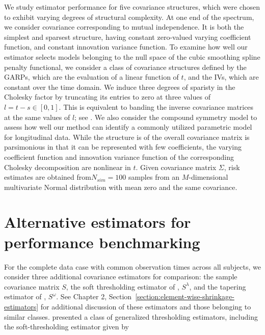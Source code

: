 \documentclass[12pt]{article}
\theoremstyle{definition}
\begin{document}
\bigskip

We study estimator performance for five covariance structures, which were chosen to exhibit varying degrees of structural complexity. At one end of the spectrum, we consider covariance corresponding to mutual independence. It is both the simplest and sparsest structure, having constant zero-valued varying coefficient function, and constant innovation variance function. To examine how well our estimator selects models belonging to the null space of the cubic smoothing spline penalty functional, we consider a class of covariance structures defined by the GARPs, which are the evaluation of a linear function of $t$, and the IVs, which are constant over the time domain. We induce three degrees of sparisty in the Cholesky factor by truncating its entries to zero at three values of $l = t - s \in \left[0,1\right]$. This is equivalent to banding the inverse covariance matrices at the same values of $l$; see \citet{bickel2008regularized}. We also consider the compound symmetry model to assess how well our method can identify a commonly utilized parametric model for longitudinal data. While the structure is of the overall covariance matrix is parsimonious in that it can be represented with few coefficients, the varying coefficient function and innovation variance function of the corresponding Cholesky decomposition are nonlinear in $t$.  Given covariance matrix $\Sigma$, risk estimates are obtained from$N_{sim} = 100$ samples from an $M$-dimensional multivariate Normal distribution with mean zero and the same covariance. 

\section{Alternative estimators for performance benchmarking}

For the complete data case with common observation times across all subjects, we consider three additional covariance estimators for comparison: the sample covariance matrix $S$, the soft thresholding estimator of \citet{rothman2009generalized},  $S^\lambda$, and the tapering estimator of \citet{cai2010optimal}, $S^\omega$. See Chapter 2, Section~\ref{section:element-wise-shrinkage-estimators} for additional discussion of these estimators and those belonging to similar classes. \citet{rothman2009generalized} presented a class of generalized thresholding estimators, including the soft-thresholding estimator given by
\end{document}
